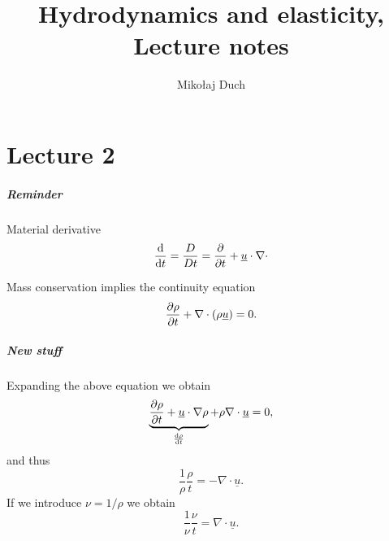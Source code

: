 \documentclass[11pt,oneside]{book}
\title{Hydrodynamics and elasticity,\\ Lecture notes}
\author{Mikołaj Duch}
\renewcommand{\vec}[1]{\underline{#1}}
\theoremstyle{definition} %
\theoremstyle{plain} %
\theoremstyle{remark} %
\theoremstyle{underline}
\begin{document}
  \maketitle
  \frontmatter


  \tableofcontents


  \mainmatter

  


  \chapter{Lecture 2}
  \paragraph{Reminder}
  Material derivative 
  \begin{displaymath}
    \dfrac{}{t} = \frac{D}{Dt} = \ptf{}{t} + \vec u \cdot \nabla \cdot
  \end{displaymath}

  Mass conservation implies the continuity equation
  \begin{displaymath}
    \ptf{\rho}{t} + \nabla \cdot ( \rho \vec u ) = 0.
  \end{displaymath}

  \paragraph{New stuff}
  Expanding the above equation we obtain
  \begin{displaymath}
    \underbrace{\ptf{\rho}{t} + \vec u \cdot \nabla \rho}_{\dfrac{\rho}{t}} + \rho \nabla \cdot \vec u = 0,
  \end{displaymath}
  and thus
  \begin{displaymath}
    \frac{1}{\rho} \dfrac{\rho}{t} = - \nabla \cdot \vec u. 
  \end{displaymath}
  If we introduce  $\nu = 1 / \rho$ we obtain
  \begin{displaymath}
    \frac{1}{\nu} \dfrac{\nu}{t} = \nabla \cdot \vec u.
  \end{displaymath}
\end{document}
